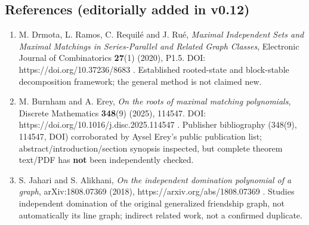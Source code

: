 \documentclass[
  10pt,
]{article}
\providecommand{\tightlist}{%
  \setlength{\itemsep}{0pt}\setlength{\parskip}{0pt}}
\begin{document}
\subsection{References (editorially added in
v0.12)}\label{references-editorially-added-in-v0.12}

\begin{enumerate}
\def\labelenumi{\arabic{enumi}.}
\tightlist
\item
  M. Drmota, L. Ramos, C. Requilé and J. Rué, \emph{Maximal Independent
  Sets and Maximal Matchings in Series-Parallel and Related Graph
  Classes}, Electronic Journal of Combinatorics \textbf{27}(1) (2020),
  P1.5. DOI: https://doi.org/10.37236/8683 . Established rooted-state
  and block-stable decomposition framework; the general method is not
  claimed new.
\item
  M. Burnham and A. Erey, \emph{On the roots of maximal matching
  polynomials}, Discrete Mathematics \textbf{348}(9) (2025), 114547.
  DOI: https://doi.org/10.1016/j.disc.2025.114547 . Publisher
  bibliography (348(9), 114547, DOI) corroborated by Aysel Erey's public
  publication list; abstract/introduction/section synopsis inspected,
  but complete theorem text/PDF has \textbf{not} been independently
  checked.
\item
  S. Jahari and S. Alikhani, \emph{On the independent domination
  polynomial of a graph}, arXiv:1808.07369 (2018),
  https://arxiv.org/abs/1808.07369 . Studies independent domination of
  the original generalized friendship graph, not automatically its line
  graph; indirect related work, not a confirmed duplicate.
\end{enumerate}
\end{document}
